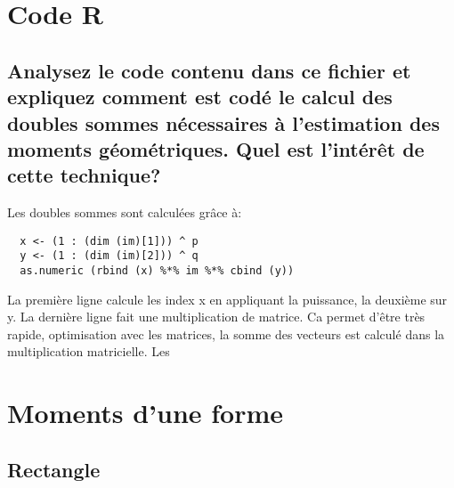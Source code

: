 \documentclass[a4paper,12pt]{report}
\begin{document}
\section*{Code R}

\subsection*{Analysez le code contenu dans ce fichier et expliquez comment est codé le calcul des doubles sommes nécessaires à l'estimation des moments géométriques. Quel est l'intérêt de cette technique?}

Les doubles sommes sont calculées grâce à:

\begin{lstlisting}
  x <- (1 : (dim (im)[1])) ^ p
  y <- (1 : (dim (im)[2])) ^ q
  as.numeric (rbind (x) %*% im %*% cbind (y))
\end{lstlisting}
La première ligne calcule les index x en appliquant la puissance,  la deuxième sur y. La dernière ligne fait une multiplication de matrice. Ca permet d'être très rapide, optimisation avec les matrices, la somme des vecteurs est calculé dans la multiplication matricielle. Les 

\section*{Moments d'une forme}

\subsection*{Rectangle}
\end{document}
